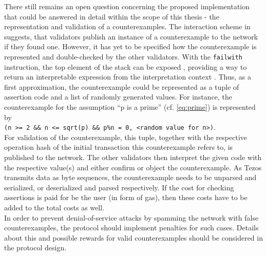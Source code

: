 There still remains an open question concerning the proposed implementation that could be answered in detail within the scope of this thesis - the representation and validation of a counterexamples. The interaction scheme in  suggests, that validators publish an instance of a counterexample to the network if they found one. However, it has yet to be specified how the counterexample is represented and double-checked by the other validators. With the \texttt{failwith} instruction, the top element of the stack can be exposed \cite{tezos_docs}, providing a way to return an interpretable expression from the interpretation context \cite{tezos_repo}. Thus, as a first approximation, the counterexample could be represented as a tuple of assertion code and a list of randomly generated values. For instance, the counterexample for the assumption ``p is a prime'' (cf. \eqref{eq:prime}) is represented by \\
\texttt{(n >= 2 \&\& n <= sqrt(p) \&\& p\%n = 0, <random value for n>)}. \\
For validation of the counterexample, this tuple, together with the respective operation hash of the initial transaction this counterexample refers to, is published to the network. The other validators then interpret the given code with the respective value(s) and either confirm or object the counterexample. As Tezos transmits data as byte sequences, the counterexample needs to be unparsed and serialized, or deserialized and parsed respectively. If the cost for checking assertions is paid for be the user (in form of gas), then these costs have to be added to the total costs as well.\\
In order to prevent denial-of-service attacks by spamming the network with false counterexamples, the protocol should implement penalties for such cases. Details about this and possible rewards for valid counterexamples should be considered in the protocol design.


